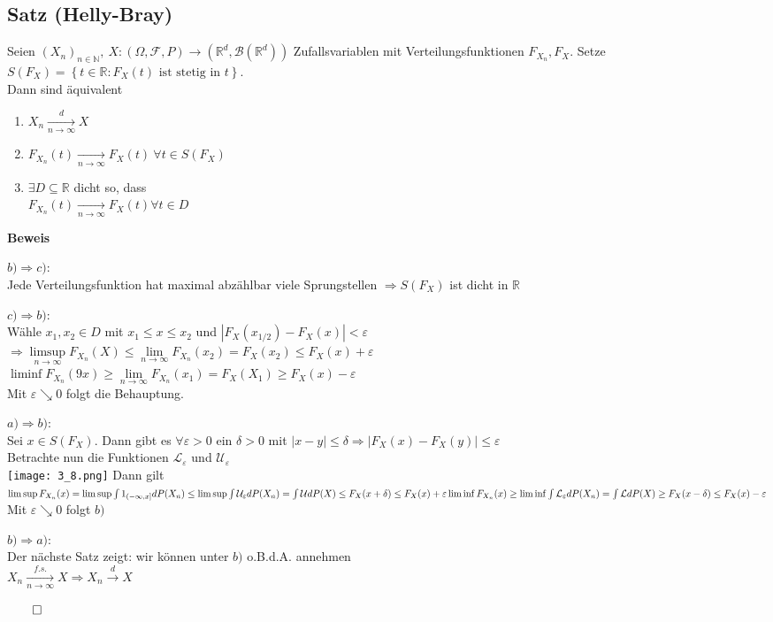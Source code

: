\documentclass[german,10pt,oneside, fleqn, a4paper]{article}
\newcommand {\R}	{\mathbb{R}}
\newcommand {\N}	{\mathbb{N}}
\newcommand{\Ra}	{\Rightarrow}
\newcommand{\ra}{\rightarrow}
\newcommand{\lsup}[1][n]{\limsup\limits_{#1\rightarrow\infty}}
\newcommand{\brc}[1]{\left(#1\right)}
\newcommand{\brac}[1]{\left\lbrace #1\right\rbrace}
\newcommand{\folge}[3][\N]{\left(#2_#3\right)_{#3\in #1}}
\newcommand{\QED}{\begin{flushright}$\qed$\end{flushright}}
\newcommand{\mc}[1]{\mathcal{#1}}
\newcommand{\beweis}{\textbf{Beweis}\\}
\newcommand{\toinf}{\rightarrow\infty}
\newcommand{\1}[1]{1_{#1}}
\newcommand{\2}[1]{\1{\brac{#1}}}
\newcommand{\xr}[2][]{\xrightarrow[#1]{#2}}
\newcommand{\rbor}[1][d]{\brc{\R^{#1},\mc{B}\brc{\R^{#1}}}}
\newcommand{\raum}{\brc{\Omega,\mc{F},P}}
\newcommand{\fe}{\forall\varepsilon>0}
\newcommand{\Xn}{X_n}
\begin{document}
\subsection{Satz (Helly-Bray)}
\label{3.8}
Seien $\folge{X}{n},\ X:\raum\ra\rbor$ Zufallsvariablen mit Verteilungsfunktionen $F_{X_n}, F_X$. Setze\\
$S(F_X)=\brac{t\in\R:F_X(t)\text{ ist stetig in }t}.$\\
Dann sind äquivalent\begin{enumerate}[label=(\alph*)]
\item $X_n\xr[n\toinf]{d}X$
\item $F_{X_n}(t)\xr[n\toinf]{}F_X(t)\ \forall t\in S(F_X)$
\item $\exists D\subseteq\R$ dicht so, dass\\
$F_{X_n}(t)\xr[n\toinf]{}F_X(t)\forall t\in D$
\end{enumerate}
\beweis
\begin{list}{•}{}
\item $b)\Ra c)$:\\
 Jede Verteilungsfunktion hat maximal abzählbar viele Sprungstellen $\Ra S(F_X)$ ist dicht in $\R$
\item $c)\Ra b)$:\\
Wähle $x_1,x_2\in D$ mit $x_1\leq x\leq x_2$ und $|F_X(x_{1/2})-F_X(x)|<\varepsilon$\\
$\Ra \lsup F_{X_n}(X)\leq \lim\limits_{n\toinf}F_{X_n}(x_2)=F_X(x_2)\leq F_X(x)+\varepsilon$\\
$\liminf F_{X_n}(9x)\geq \lim\limits_{n\toinf}F_{X_n}(x_1)=F_X(X_1)\geq F_X(x)-\varepsilon$\\
Mit $\varepsilon\searrow0$ folgt die Behauptung.
\item $a)\Ra b)$:\\
Sei $x\in S(F_X)$. Dann gibt es $\fe$ ein $\delta>0$ mit $|x-y|\leq\delta\Ra|F_X(x)-F_X(y)|\leq\varepsilon$\\
Betrachte nun die Funktionen $\mc{L}_\varepsilon$ und $\mc{U}_\varepsilon$\\
\texttt{[image: 3\_8.png]}
Dann gilt\\
$\limsup F_{\Xn}(x)=\limsup\int \1{(-\infty,x]}dP(\Xn)\leq\limsup\int \mc{U}_\varepsilon dP(X_n)=\int\mc{U}dP(X)\leq F_X(x+\delta)\leq F_X(x)+\varepsilon\\
\liminf F_{\Xn}(x)\geq\liminf\int \mc{L}_\varepsilon dP(X_n)=\int\mc{L}dP(X)\geq F_X(x-\delta)\leq F_X(x)-\varepsilon$\\
Mit $\varepsilon\searrow0$ folgt $b)$
\item $b)\Ra a)$:\\
Der nächste Satz zeigt: wir können unter $b)$ o.B.d.A. annehmen\\
$X_n\xr[n\toinf]{f.s.}X\Ra X_n\xr{d}X$\QED
\end{list}
\end{document}
